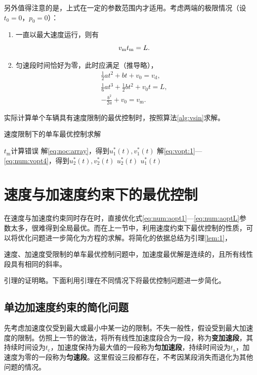 另外值得注意的是，上式在一定的参数范围内才适用。考虑两端的极限情况（设$t_0=0$，$p_0=0$）：
\begin{enumerate}[label=(\arabic*)]
\item 一直以最大速度运行，则有
\begin{equation}
v_\mathrm{m}t_\mathrm{m}=L.\\
\end{equation}
\item 匀速段时间恰好为零，此时应满足（推导略），
\begin{gather}
\frac12at^2+bt+v_0=v_\mathrm{d},\\
\frac16at^3+\frac12bt^2+v_0t=L,\\
-\frac{b^2}{2a}+v_0=v_\mathrm{m}.
\end{gather}
\end{enumerate}
实际计算单个车辆具有速度限制的最优控制时，按照算法\ref{alg:vsin}求解。
\begin{algorithm}
\caption{速度限制下的单车最优控制求解}
\label{alg:vsin}
\begin{algorithmic}
  \Statex
      \State $t_\mathrm{m}$计算错误
      \State \Return
    \EndIf
    \State 解\eqref{eq:noc:array}，得到$u_1^*(t),v^*_1(t)$
      \State 解\eqref{eq:vopt:1}---\eqref{eq:num:vopt4}，得到$u_2^*(t),v^*_2(t)$
      \State \Return $u_2^*(t)$
    \Else
      \State \Return $u_1^*(t)$
    \EndIf
  \EndFunction
\end{algorithmic}
\end{algorithm}

\section{速度与加速度约束下的最优控制}
在速度与加速度约束同时存在时，直接优化式\eqref{eq:num:aopt1}---\eqref{eq:num:aoptL}参数太多，很难得到全局最优。而在上一节中，利用速度约束下最优控制的性质，可以将优化问题进一步简化为方程的求解。将简化的依据总结为引理\ref{lem:1}，
\begin{lemma}
速度、加速度受限制的单车最优控制问题中，加速度最优解是连续的，且所有线性段具有相同的斜率。
\label{lem:1}
\end{lemma}
引理的证明略。下面利用引理在不同情况下将最优控制问题进一步简化。

\subsection{单边加速度约束的简化问题}
先考虑加速度仅受到最大或最小中某一边的限制。不失一般性，假设受到最大加速度的限制。仿照上一节的做法，将所有线性加速度段合为一段，称为\textbf{变加速段}，其持续时间设为$t_\mathrm{c}$，加速度保持为最大值的一段称为\textbf{匀加速段}，持续时间设为$t_\mathrm{a}$，加速度为零的一段称为\textbf{匀速段}。这里假设三段都存在，不考因某段消失而退化为其他问题的情况。

